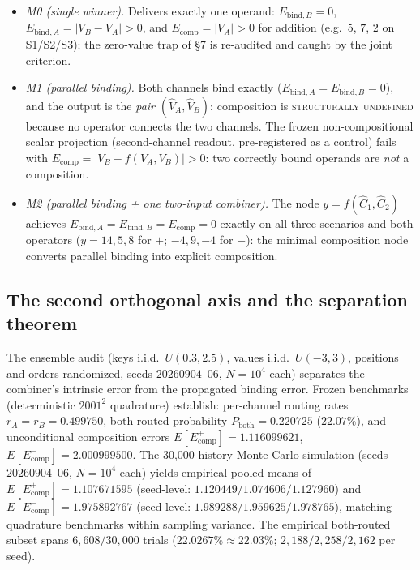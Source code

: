 \begin{itemize}[leftmargin=*,noitemsep,topsep=1pt]
\item \emph{M0 (single winner).} Delivers exactly one operand:
$E_{\mathrm{bind},B}=0$, $E_{\mathrm{bind},A}=|V_B-V_A|>0$, and
$E_{\mathrm{comp}}=|V_A|>0$ for addition (e.g.\ $5$, $7$, $2$ on
S1/S2/S3); the zero-value trap of §7 is re-audited and caught by the
joint criterion.
\item \emph{M1 (parallel binding).} Both channels bind exactly
($E_{\mathrm{bind},A}=E_{\mathrm{bind},B}=0$), and the output is the
\emph{pair} $(\hat V_A,\hat V_B)$: composition is
\textsc{structurally undefined} because no operator connects the two
channels. The frozen non-compositional scalar projection (second-channel
readout, pre-registered as a control) fails with
$E_{\mathrm{comp}}=|V_B-f(V_A,V_B)|>0$: two correctly bound operands are
\emph{not} a composition.
\item \emph{M2 (parallel binding + one two-input combiner).} The node
$y=f(\hat C_1,\hat C_2)$ achieves $E_{\mathrm{bind},A}=E_{\mathrm{bind},B}
=E_{\mathrm{comp}}=0$ exactly on all three scenarios and both operators
($y=14,5,8$ for $+$; $-4,9,-4$ for $-$): the minimal composition node
converts parallel binding into explicit composition.
\end{itemize}

\subsection{The second orthogonal axis and the separation theorem}
\label{sec:separation}

The ensemble audit (keys i.i.d.\ $U(0.3,2.5)$, values i.i.d.\ $U(-3,3)$,
positions and orders randomized, seeds $20260904$--$06$, $N=10^4$ each)
separates the combiner's intrinsic error from the propagated binding
error. Frozen benchmarks (deterministic $2001^2$ quadrature) establish: per-channel
routing rates $r_A=r_B=0.499750$, both-routed probability $P_{\mathrm{both}}=0.220725$ ($22.07\%$),
and unconditional composition errors $E[E_{\mathrm{comp}}^+]=1.116099621$,
$E[E_{\mathrm{comp}}^-]=2.000999500$. The 30,000-history Monte Carlo simulation (seeds $20260904$--$06$,
$N=10^4$ each) yields empirical pooled means of $E[E_{\mathrm{comp}}^+]=1.107671595$
(seed-level: $1.120449 / 1.074606 / 1.127960$) and $E[E_{\mathrm{comp}}^-]=1.975892767$
(seed-level: $1.989288 / 1.959625 / 1.978765$), matching quadrature benchmarks within sampling variance.
The empirical both-routed subset spans $6{,}608 / 30{,}000$ trials ($22.0267\% \approx 22.03\%$;
$2{,}188 / 2{,}258 / 2{,}162$ per seed).

